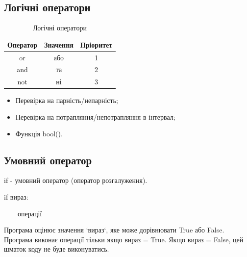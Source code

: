  \subsection{Логічні оператори} 
\begin{frame}
\begin{table}
  \caption{Логічні оператори}
  \label{tab:}

  \begin{center}
    \begin{tabular}{|c|c|c|}
    \hline
      \textbf{Оператор} & \textbf{Значення} & \textbf{Пріоритет} \\
    \hline  
      or & або & 1 \\
    \hline
      and & та & 2 \\
    \hline
      not & ні & 3 \\
    \hline
    \end{tabular}
  \end{center}
\end{table}
\end{frame}

\begin{frame}
\begin{itemize}
  \item Перевірка на парність/непарність;
  \item Перевірка на потрапляння/непотрапляння в інтервал;
  \item Функція bool().
 \end{itemize}
\end{frame}

 \subsection{Умовний оператор} 
\begin{frame}
if - умовний оператор (оператор розгалуження).

\huge{if вираз:

~~~~операції}


\begin{flushleft}
\normalsize
Програма оцінює значення `вираз`, яке може дорівнювати True або False. Програма виконає операції тільки якщо вираз = True. Якщо вираз = False, цей шматок коду не буде виконуватись.
\end{flushleft}
\end{frame}

